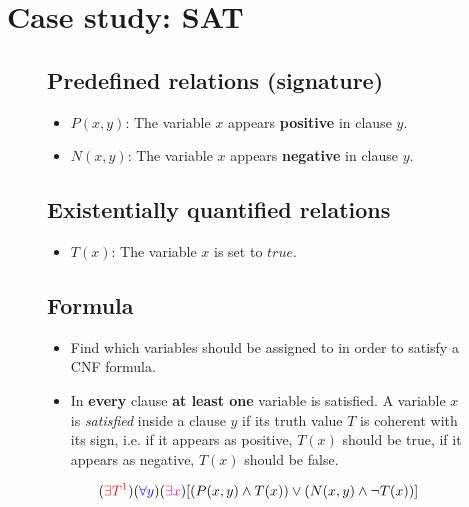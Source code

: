 \documentclass[portrait]{sciposter}
\begin{document}
\section*{\large{Case study: SAT}}

\begin{figure}[ht]
\begin{minipage}{0.666\linewidth}
\begin{multicols}{2}
\subsection*{Predefined relations (signature)}
\begin{large}
\begin{itemize}
\item $P(x, y)$: The variable $x$ appears \textbf{positive} in clause $y$.
\item $N(x, y)$: The variable $x$ appears \textbf{negative} in clause $y$.
\end{itemize}

\subsection*{Existentially quantified relations}
\begin{itemize}
\item $T(x)$: The variable $x$ is set to $true$.
\end{itemize}
\end{large}

\subsection*{Formula}
\begin{large}
\begin{itemize}
    \item Find which variables should be assigned to {} in order
        to satisfy a CNF formula.
    \item In {\color{blue} \textbf{every}} clause {\color{magenta}\textbf{at least one}}
        variable is satisfied. A variable $x$ is \emph{satisfied} 
        inside a clause $y$ if its truth
        value $T$ is coherent with its sign, i.e. if it appears as
        positive, $T(x)$ should be true, if it appears as negative,
        $T(x)$ should be false.
\end{itemize}


\[ ({\color{red}\exists T^1})({\color{blue}\forall y})({\color{magenta}\exists x})[(P(x,y)\land T(x))\lor(N(x,y)\land\neg T(x))] \]
\end{large}


\end{multicols}
\end{minipage}
\end{figure}
\end{document}
